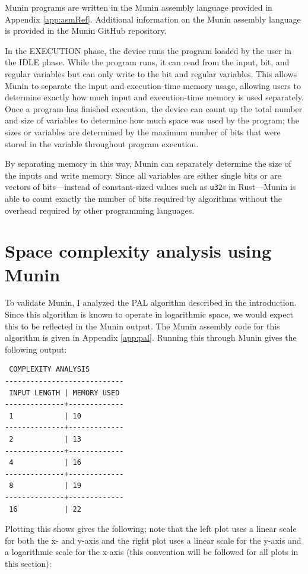 \documentclass[11pt, a4paper]{article}
\begin{document}
Munin programs are written in the Munin assembly language provided in Appendix \ref{app:asmRef}.
Additional information on the Munin assembly language is provided in the Munin GitHub repository.

In the EXECUTION phase, the device runs the program loaded by the user in the IDLE phase.
While the program runs, it can read from the input, bit, and regular variables but can only write to the bit and regular variables.
This allows Munin to separate the input and execution-time memory usage, allowing users to determine exactly how much input and execution-time memory is used separately.
Once a program has finished execution, the device can count up the total number and size of variables to determine how much space was used by the program; the sizes or variables are determined by the maximum number of bits that were stored in the variable throughout program execution.

By separating memory in this way, Munin can separately determine the size of the inputs and write memory.
Since all variables are either single bits or are vectors of bits—instead of constant-sized values such as \lstinline|u32|s in Rust—Munin is able to count exactly the number of bits required by algorithms without the overhead required by other programming languages.

\section{Space complexity analysis using Munin}

To validate Munin, I analyzed the PAL algorithm described in the introduction.
Since this algorithm is known to operate in logarithmic space, we would expect this to be reflected in the Munin output.
The Munin assembly code for this algorithm is given in Appendix \ref{app:pal}.
Running this through Munin gives the following output:

\begin{lstlisting}
 COMPLEXITY ANALYSIS
----------------------------
 INPUT LENGTH | MEMORY USED 
--------------+-------------
 1            | 10      
--------------+-------------
 2            | 13      
--------------+-------------
 4            | 16      
--------------+-------------
 8            | 19      
--------------+-------------
 16           | 22      
\end{lstlisting}

Plotting this shows gives the following; note that the left plot uses a linear scale for both the x- and y-axis and the right plot uses a linear scale for the y-axis and a logarithmic scale for the x-axis (this convention will be followed for all plots in this section):
\end{document}
